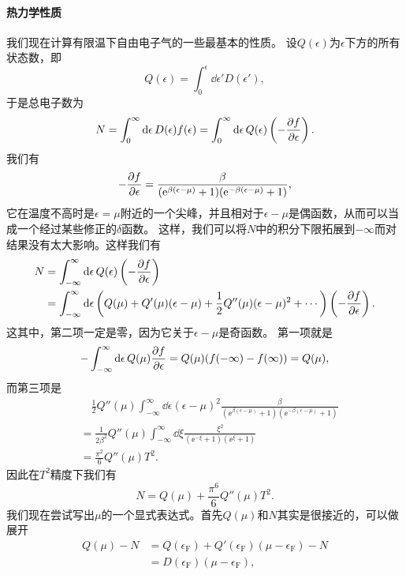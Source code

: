 \paragraph{热力学性质} 我们现在计算有限温下自由电子气的一些最基本的性质。
设$Q(\epsilon)$为$\epsilon$下方的所有状态数，即
\begin{equation}
    Q(\epsilon) = \int_0^\epsilon \dd{\epsilon'} D(\epsilon'),
\end{equation}
于是总电子数为
\[
    N = \int_0^\infty \dd{\epsilon} D(\epsilon) f(\epsilon) = \int_0^\infty \dd{\epsilon} Q(\epsilon) \left( - \pdv{f}{\epsilon} \right).
\]
我们有
\[
    - \pdv{f}{\epsilon} = \frac{\beta}{(\mathrm{e}^{\beta (\epsilon - \mu)} + 1) (\mathrm{e}^{- \beta (\epsilon - \mu)} + 1)},
\]
它在温度不高时是$\epsilon = \mu$附近的一个尖峰，并且相对于$\epsilon - \mu$是偶函数，从而可以当成一个经过某些修正的$\delta$函数。
这样，我们可以将$N$中的积分下限拓展到$-\infty$而对结果没有太大影响。这样我们有
\[
    \begin{aligned}
        N &= \int_{-\infty}^\infty \dd{\epsilon} Q(\epsilon) \left(-\pdv{f}{\epsilon}\right) \\
        &= \int_{-\infty}^\infty \dd{\epsilon} \left( Q(\mu) + Q'(\mu) (\epsilon - \mu) + \frac{1}{2} Q''(\mu) (\epsilon - \mu)^2 + \cdots \right) \left(-\pdv{f}{\epsilon}\right) .
    \end{aligned}
\]
这其中，第二项一定是零，因为它关于$\epsilon - \mu$是奇函数。
第一项就是
\[
    - \int_{-\infty}^\infty \dd{\epsilon} Q(\mu) \pdv{f}{\epsilon} = Q(\mu) (f(-\infty) - f(\infty)) = Q(\mu), 
\]
而第三项是
\[
    \begin{aligned}
        &\quad \frac{1}{2} Q''(\mu) \int_{-\infty}^\infty \dd{\epsilon} (\epsilon - \mu)^2 \frac{\beta}{(\ee^{\beta (\epsilon - \mu)} + 1) (\ee^{- \beta (\epsilon - \mu)} + 1)} \\
        &= \frac{1}{2 \beta^2} Q''(\mu) \int_{-\infty}^\infty \dd{\xi} \frac{\xi^2}{(\ee^{-\xi} + 1) (\ee^{\xi} + 1)} \\
        &= \frac{\pi^2}{6} Q''(\mu) T^2.
    \end{aligned}
\]
因此在$T^2$精度下我们有
\begin{equation}
    N = Q(\mu) + \frac{\pi^6}{6} Q''(\mu) T^2.
\end{equation}
我们现在尝试写出$\mu$的一个显式表达式。首先$Q(\mu)$和$N$其实是很接近的，可以做展开
\[
    \begin{aligned}
        Q(\mu) - N &= Q(\epsilon_\text{F}) + Q'(\epsilon_\text{F}) (\mu - \epsilon_\text{F}) - N \\
        &= D(\epsilon_\text{F}) (\mu - \epsilon_\text{F}),
    \end{aligned}
\]
